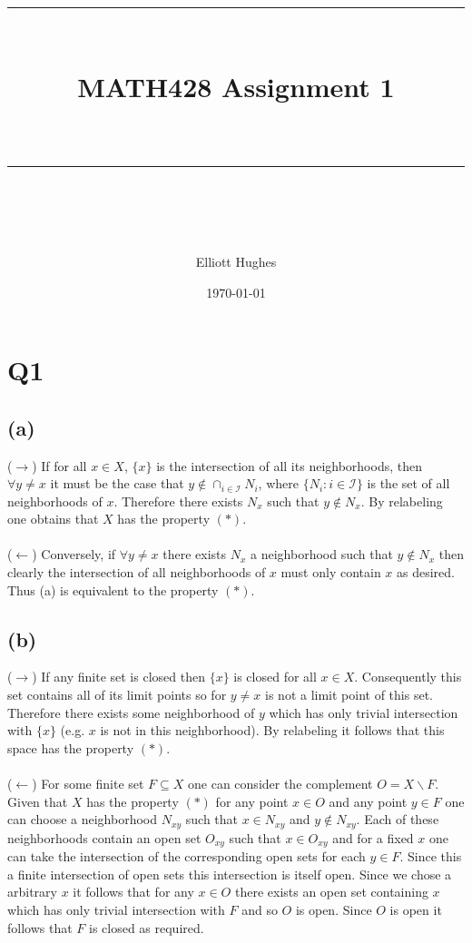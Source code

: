 \documentclass{article}
\title{	
	\normalfont\normalsize 
	\rule{\linewidth}{0.5pt}\\ %
	\vspace{14pt} %
	{\LARGE MATH428 Assignment 1 \\ %
    \large \textit{} \\}
	\vspace{6pt} %
	\rule{\linewidth}{1pt}\\ %
}
\author{Elliott Hughes}
\date{\normalsize\today}
\begin{document}
\maketitle

\section*{Q1}
\subsection*{(a)}
($\rightarrow$) If for all $x \in X$, $\{x\}$ is the intersection of all its neighborhoods, then $\forall y \neq x$ 
it must be the case that $y \notin \cap_{i \in \mathcal{I}} N_i$, where $\{N_i:i \in \mathcal{I}\}$ is the 
set of all neighborhoods of $x$. Therefore 
there exists $N_x$ such that $y \notin N_x$. By relabeling one obtains that $X$ has the property 
$(*)$.

\paragraph{}
($\leftarrow$) Conversely, if $\forall y \neq x$ there exists $N_x$ a neighborhood such that $y \notin N_x$ 
then clearly the intersection of all neighborhoods of $x$ must only contain $x$ as desired. 
Thus (a) is equivalent to the property $(*)$.

\subsection*{(b)}
($\rightarrow$) If any finite set is closed then $\{x\}$ is closed for all $x \in X$. Consequently 
this set contains all of its limit points so for $y \neq x$ is not a limit point 
of this set. Therefore there exists some neighborhood of $y$ which has only trivial intersection 
with $\{x\}$ (e.g. $x$ is not in this neighborhood). By relabeling it follows that this space 
has the property $(*)$.

\paragraph{}
($\leftarrow$) For some finite set $F \subseteq X$ one can consider the complement $O = X\backslash F$. 
Given that $X$ has the property $(*)$ for 
any point $x \in O$ and any point $y \in F$ one can choose a neighborhood $N_{xy}$ such that 
$x \in N_{xy}$ and $y \notin N_{xy}$. Each of these neighborhoods contain an open set $O_{xy}$ 
such that $x \in O_{xy}$ 
and for a fixed $x$ one can take the intersection of the corresponding open sets for each $y \in F$. 
Since this a finite intersection of open sets this intersection is itself open. Since we chose a 
arbitrary $x$ it follows that for any $x \in O$ there exists an open set containing $x$ which has only trivial 
intersection with $F$ and so $O$ is open. Since $O$ is open it follows that $F$ is closed as required.
\end{document}
